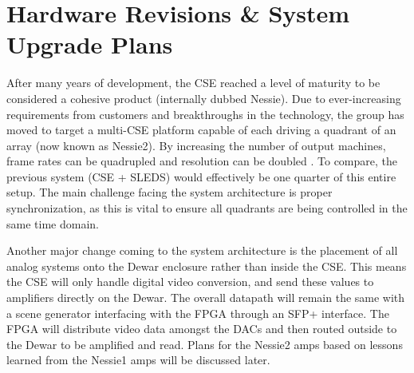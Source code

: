 \section{Hardware Revisions \& System Upgrade Plans}
After many years of development, the CSE reached a level of maturity to be considered a cohesive product (internally dubbed Nessie). Due to ever-increasing requirements from customers and breakthroughs in the technology, the group has moved to target a multi-CSE platform capable of each driving a quadrant of an array (now known as Nessie2). By increasing the number of output machines, frame rates can be quadrupled and resolution can be doubled \cite{chris}. To compare, the previous system (CSE + SLEDS) would effectively be one quarter of this entire setup. The main challenge facing the system architecture is proper synchronization, as this is vital to ensure all quadrants are being controlled in the same time domain.\par
Another major change coming to the system architecture is the placement of all analog systems onto the Dewar enclosure rather than inside the CSE. This means the CSE will only handle digital video conversion, and send these values to amplifiers directly on the Dewar. The overall datapath will remain the same with a scene generator interfacing with the FPGA through an SFP+ interface. The FPGA will distribute video data amongst the DACs and then routed outside to the Dewar to be amplified and read. Plans for the Nessie2 amps based on lessons learned from the Nessie1 amps will be discussed later.
